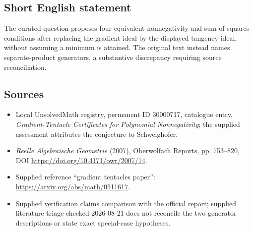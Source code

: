 \documentclass[11pt]{article}
\begin{document}
\subsection{Short English statement}
The curated question proposes four equivalent nonnegativity and sum-of-squares conditions after replacing the gradient ideal by the displayed tangency ideal, without assuming a minimum is attained. The original text instead names separate-product generators, a substantive discrepancy requiring source reconciliation.
\subsection{Sources}
\begin{itemize}
\item Local UnsolvedMath registry, permanent ID 30000717, catalogue entry, \emph{Gradient-Tentacle Certificates for Polynomial Nonnegativity}; the supplied assessment attributes the conjecture to Schweighofer.
\item \emph{Reelle Algebraische Geometrie} (2007), Oberwolfach Reports, pp. 753--820, DOI \url{https://doi.org/10.4171/owr/2007/14}.
\item Supplied reference ``gradient tentacles paper'': \url{https://arxiv.org/abs/math/0511617}.
\item Supplied verification claims comparison with the official report; supplied literature triage checked 2026-08-21 does not reconcile the two generator descriptions or state exact special-case hypotheses.
\end{itemize}
\end{document}
